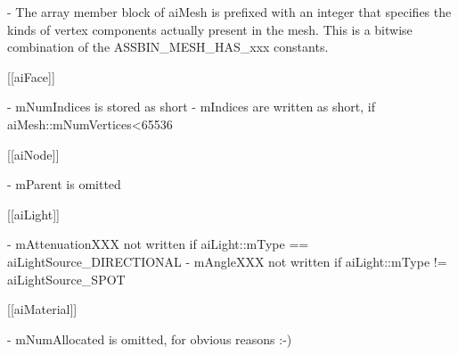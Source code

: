 \begin{DoxyVerb}
   - The array member block of aiMesh is prefixed with an integer that specifies 
     the kinds of vertex components actually present in the mesh. This is a 
     bitwise combination of the ASSBIN_MESH_HAS_xxx constants.

[[aiFace]]

   - mNumIndices is stored as short
   - mIndices are written as short, if aiMesh::mNumVertices<65536

[[aiNode]]

   - mParent is omitted

[[aiLight]]

   - mAttenuationXXX not written if aiLight::mType == aiLightSource_DIRECTIONAL
   - mAngleXXX not written if aiLight::mType != aiLightSource_SPOT

[[aiMaterial]]

   - mNumAllocated is omitted, for obvious reasons :-)\end{DoxyVerb}
 
